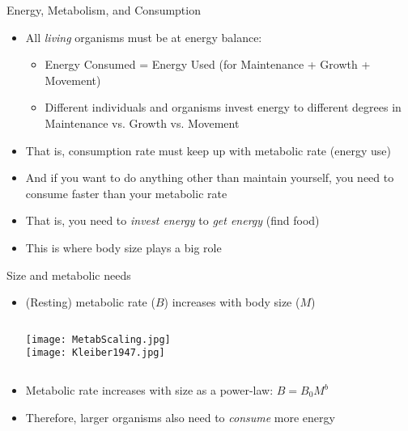 \begin{frame}{Energy, Metabolism, and Consumption}

  \begin{itemize}[<+->]\setlength{\itemindent}{-1em} \itemsep10pt
    \item All {\it living\/} organisms must be at energy balance:\\
    \begin{itemize}
      \item Energy Consumed = Energy Used (for Maintenance + Growth + Movement)
      \item Different individuals and organisms invest energy to different degrees in Maintenance vs. Growth vs. Movement 
    \end{itemize}
    \item That is, consumption rate must keep up with metabolic rate (energy use)
    \item And if you want to do anything other than maintain yourself, you need to consume faster than your metabolic rate
    \item That is, you need to {\it invest energy} to {\it get energy} (find food)
    \item This is where body size plays a big role 
  \end{itemize}
\end{frame}


\begin{frame}{Size and metabolic needs}

  \begin{itemize}[<+->]\itemsep3pt
    \item (Resting) metabolic rate ($B$) increases with body size ($M$) 
    \vspace{6pt}
    \begin{columns}[c]
	    \centering
        \texttt{[image: MetabScaling.jpg]}\\ 
	    \centering
	      \texttt{[image: Kleiber1947.jpg]}
    \end{columns}
    \item {} Metabolic rate increases with size as a power-law\footnotemark: $B = B_0 M^b$
    \item Therefore, larger organisms also need to {\it consume} more energy 
  \end{itemize}


\end{frame}

